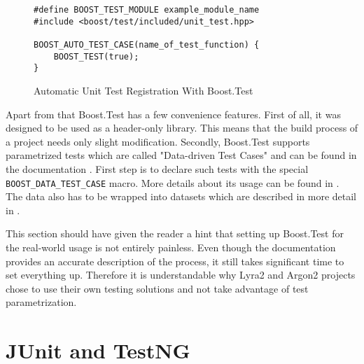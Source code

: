 \begin{figure}
\centering
\begin{verbatim}
#define BOOST_TEST_MODULE example_module_name
#include <boost/test/included/unit_test.hpp>

BOOST_AUTO_TEST_CASE(name_of_test_function) {
    BOOST_TEST(true);
}
  \end{verbatim}
  \caption{Automatic Unit Test Registration With Boost.Test}
  \label{fig:boost-auto-test-case}
\end{figure}

Apart from that Boost.Test has a few convenience features. First of all, it was designed to be used as a header-only library. This means that the build process of a project needs only slight modification. Secondly, Boost.Test supports parametrized tests which are called "Data-driven Test Cases" and can be found in the documentation \cite{boost:2017:test-data-driven}. First step is to declare such tests with the special \texttt{BOOST\_DATA\_TEST\_CASE} macro. More details about its usage can be found in \cite{boost:2017:test-docs-data-macro}. The data also has to be wrapped into datasets which are described in more detail in \cite{boost:2017:test-docs-dataset}.

This section should have given the reader a hint that setting up Boost.Test for the real-world usage is not entirely painless. Even though the documentation provides an accurate description of the process, it still takes significant time to set everything up. Therefore it is understandable why Lyra2 and Argon2 projects chose to use their own testing solutions and not take advantage of test parametrization.

\section{JUnit and TestNG}
\label{sec:unit-junit-testng}

